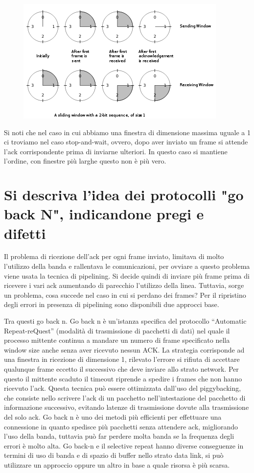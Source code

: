 \begin{figure}[H]
\centering
\includegraphics[scale=1]{res/img/19_SlidingWindow.png}
\end{figure}
 
Si noti che nel caso in cui abbiamo una finestra di dimensione massima uguale a 1 ci troviamo nel caso stop-and-wait, ovvero, dopo aver inviato un frame si attende l'ack corrispondente prima di inviarne ulteriori. In questo caso si mantiene l'ordine, con finestre più larghe questo non è più vero.

\section{Si descriva l'idea dei protocolli "go back N", indicandone pregi e difetti}

Il problema di ricezione dell'ack per ogni frame inviato, limitava di molto l'utilizzo della banda e rallentava le comunicazioni, per ovviare a questo problema viene usata la tecnica di pipelining. Si decide quindi di inviare più frame prima di ricevere i vari ack aumentando di parecchio l'utilizzo della linea. Tuttavia, sorge un problema, cosa succede nel caso in cui si perdano dei frames? Per il ripristino degli errori in presenza di pipelining sono disponibili due approcci base.

Tra questi go back n. Go back n è un'istanza specifica del protocollo “Automatic Repeat-reQuest” (modalità di trasmissione di pacchetti di dati) nel quale il processo mittente continua a mandare un numero di frame specificato nella window size anche senza aver ricevuto nessun ACK.
La strategia corrisponde ad una finestra in ricezione di dimensione 1, rilevato l'errore si rifiuta di accettare qualunque frame eccetto il successivo che deve inviare allo strato network. Per questo il mittente scaduto il timeout riprende a spedire i frames che non hanno ricevuto l'ack.
Questa tecnica può essere ottimizzata dall'uso del piggybacking, che consiste nello scrivere l'ack di un pacchetto nell'intestazione del pacchetto di informazione successivo, evitando latenze di trasmissione dovute alla trasmissione del solo ack.
Go back n è uno dei metodi più efficienti per effettuare una connessione in quanto spedisce più pacchetti senza attendere ack, migliorando l'uso della banda, tuttavia può far perdere molta banda se la frequenza degli errori è molto alta.
Go back-n e il selective repeat hanno diverse conseguenze in termini di uso di banda e di spazio di buffer nello strato data link, si può utilizzare un approccio oppure un altro in base a quale risorsa è più scarsa.

